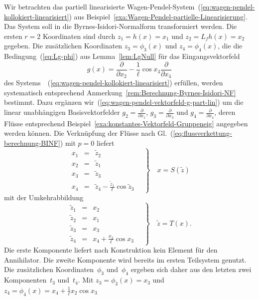 \begin{example}
\label{exa:Wagen-Pendel-System-BINF}Wir betrachten das partiell linearisierte
Wagen-Pendel-System~(\ref{eq:wagen-pendel-kollokiert-linearisiert})
aus Beispiel~\ref{exa:Wagen-Pendel-partielle-Linearisierung}. Das
System soll in die Byrnes-Isidori-Normalform transformiert werden.
Die ersten $r=2$ Koordinaten sind durch $z_{1}=h(x)=x_{1}$ und $z_{2}=L_{f}h(x)=x_{2}$
gegeben. Die zusätzlichen Koordinaten $z_{3}=\phi_{3}(x)$ und $z_{4}=\phi_{4}(x)$,
die die Bedingung~(\ref{eq:Lg-phi}) aus Lemma~\ref{lem:LgNull}
für das Eingangsvektorfeld
\begin{equation}
g(x)=\frac{\partial}{\partial x_{2}}-\frac{1}{\ell}\cos x_{3}\frac{\partial}{\partial x_{4}}\label{eq:wagen-pendel-vektorfeld-g-part-lin}
\end{equation}
des Systems~~(\ref{eq:wagen-pendel-kollokiert-linearisiert}) erfüllen,
werden systematisch entsprechend Anmerkung~\ref{rem:Berechnung-Byrnes-Isidori-NF}
bestimmt. Dazu ergänzen wir~(\ref{eq:wagen-pendel-vektorfeld-g-part-lin})
um die linear unabhängigen Basisvektorfelder $g_{2}=\tfrac{\partial}{\partial x_{1}}$,
$g_{3}=\tfrac{\partial}{\partial x_{3}}$ und $g_{4}=\tfrac{\partial}{\partial x_{4}}$,
deren Flüsse entsprechend Beispiel~\ref{exa:konstantes-Vektorfeld-Gruppeneig}
angegeben werden können. Die Verknüpfung der Flüsse nach Gl.~(\ref{eq:flussverkettung-berechnung-BINF})
mit $p=0$ liefert 
\[
\left.\begin{array}{lcl}
x_{1} & = & \tilde{z}_{2}\\
x_{2} & = & \tilde{z}_{1}\\
x_{3} & = & \tilde{z}_{3}\\
x_{4} & = & \tilde{z}_{4}-\frac{\tilde{z}_{1}}{\ell}\cos\tilde{z}_{3}
\end{array}\quad\right\} \quad x=S(\tilde{z})
\]
mit der Umkehrabbildung 
\[
\left.\begin{array}{lcl}
\tilde{z}_{1} & = & x_{2}\\
\tilde{z}_{2} & = & x_{1}\\
\tilde{z}_{3} & = & x_{3}\\
\tilde{z}_{4} & = & x_{4}+\frac{x_{2}}{\ell}\cos x_{3}
\end{array}\quad\right\} \quad\tilde{z}=T(x).
\]
Die erste Komponente liefert nach Konstruktion kein Element für den
Annihilator. Die zweite Komponente wird bereits im ersten Teilsystem
genutzt. Die zusätzlichen Koordinaten~$\phi_{3}$ und~$\phi_{4}$
ergeben sich daher aus den letzten zwei Komponenten~$t_{3}$ und~$t_{4}$.
Mit $z_{3}=\phi_{3}(x)=x_{3}$ und $z_{4}=\phi_{4}(x)=x_{4}+\tfrac{1}{\ell}x_{2}\cos x_{3}$

\end{example}
